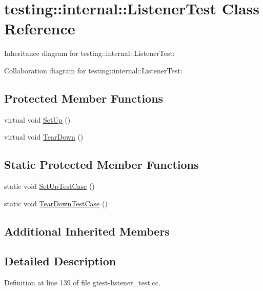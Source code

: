 \hypertarget{classtesting_1_1internal_1_1_listener_test}{}\section{testing\+:\+:internal\+:\+:Listener\+Test Class Reference}
\label{classtesting_1_1internal_1_1_listener_test}


Inheritance diagram for testing\+:\+:internal\+:\+:Listener\+Test\+:


Collaboration diagram for testing\+:\+:internal\+:\+:Listener\+Test\+:
\subsection*{Protected Member Functions}
\begin{DoxyCompactItemize}
\item 
virtual void \hyperlink{classtesting_1_1internal_1_1_listener_test_ace3dbe36b705ddf320518e6cdd919bc8}{Set\+Up} ()
\item 
virtual void \hyperlink{classtesting_1_1internal_1_1_listener_test_ad112535025d668e3ea14e71d8741c810}{Tear\+Down} ()
\end{DoxyCompactItemize}
\subsection*{Static Protected Member Functions}
\begin{DoxyCompactItemize}
\item 
static void \hyperlink{classtesting_1_1internal_1_1_listener_test_a7cbc298576e584b4021d0375204b7391}{Set\+Up\+Test\+Case} ()
\item 
static void \hyperlink{classtesting_1_1internal_1_1_listener_test_aa35b5f1c6235f0fe98aa2c7f35bb8fe1}{Tear\+Down\+Test\+Case} ()
\end{DoxyCompactItemize}
\subsection*{Additional Inherited Members}


\subsection{Detailed Description}


Definition at line 139 of file gtest-\/listener\+\_\+test.\+cc.



